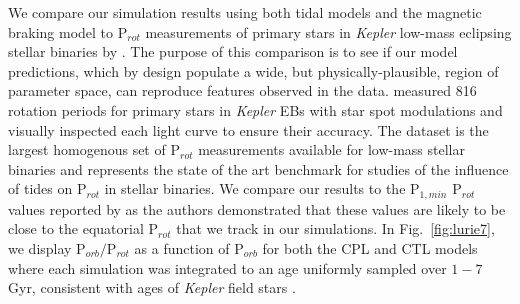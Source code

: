 \documentclass[twocolumn]{aastex61}
\newcommand{\kepler}[0]{\textit{Kepler}\xspace}
\begin{document}
We compare our simulation results using both tidal models and the \citet{Matt2015} magnetic braking model to P$_{rot}$ measurements of primary stars in \kepler low-mass eclipsing stellar binaries by \citet{Lurie2017}. The purpose of this comparison is to see if our model predictions, which by design populate a wide, but physically-plausible, region of parameter space, can reproduce features observed in the data.  \citet{Lurie2017} measured 816 rotation periods for primary stars in \kepler EBs with star spot modulations and visually inspected each light curve to ensure their accuracy. The \citet{Lurie2017} dataset is the largest homogenous set of P$_{rot}$ measurements available for low-mass stellar binaries and represents the state of the art benchmark for studies of the influence of tides on P$_{rot}$ in stellar binaries. We compare our results to the P$_{1,min}$ P$_{rot}$ values reported by \citet{Lurie2017} as the authors demonstrated that these values are likely to be close to the equatorial P$_{rot}$ that we track in our simulations. In Fig.~\ref{fig:lurie7}, we display P$_{orb}/$P$_{rot}$ as a function of P$_{orb}$ for both the CPL and CTL models where each simulation was integrated to an age uniformly sampled over $1-7$ Gyr, consistent with ages of \kepler field stars \citep{Chaplin2014}. 
\end{document}
